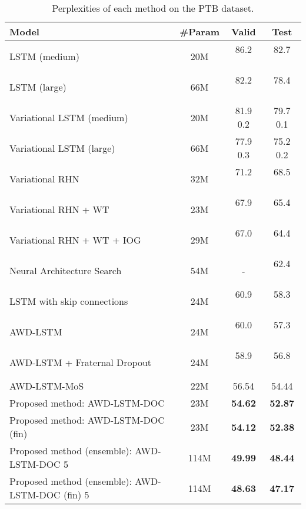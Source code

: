 \documentclass[11pt,a4paper]{article}
\begin{document}
\begin{table*}[!t]
  \centering
  \small
  \begin{tabular}{| l  | c | c c |} \hline
  Model & \#Param & Valid & Test \\ \hline
  LSTM (medium) \cite{DBLP:journals/corr/ZarembaSV14} & 20M & 86.2  \ \  & 82.7  \ \  \\
  LSTM (large) \cite{DBLP:journals/corr/ZarembaSV14} & 66M & 82.2  \ \  & 78.4  \ \  \\
  Variational LSTM (medium) \cite{Gal2016Theoretically} & 20M & 81.9  0.2 & 79.7  0.1 \\
  Variational LSTM (large) \cite{Gal2016Theoretically} & 66M & 77.9  0.3 & 75.2  0.2 \\
  Variational RHN \cite{zilly2016recurrent} & 32M & 71.2  \ \  & 68.5  \ \  \\
  Variational RHN + WT \cite{zilly2016recurrent} & 23M & 67.9  \ \  & 65.4  \ \ \\
  Variational RHN + WT + IOG \cite{takase-suzuki-nagata:2017:I17-2} & 29M & 67.0  \ \  & 64.4 \ \  \\
  Neural Architecture Search \cite{45826} & 54M & - & 62.4 \ \  \\
  LSTM with skip connections \cite{DBLP:journals/corr/MelisDB17} & 24M & 60.9  \ \  & 58.3 \ \  \\
  AWD-LSTM \cite{merityRegOpt} & 24M & 60.0  \ \  & 57.3 \ \  \\
  AWD-LSTM + Fraternal Dropout \cite{fraternal} & 24M & 58.9  \ \  & 56.8 \ \  \\
  AWD-LSTM-MoS \cite{DBLP:journals/corr/abs-1711-03953} & 22M & 56.54 & 54.44 \\ \hline
  Proposed method: AWD-LSTM-DOC & 23M & {\bf 54.62} & {\bf 52.87} \\
  Proposed method: AWD-LSTM-DOC (fin) & 23M & {\bf 54.12} & {\bf 52.38} \\
  Proposed method (ensemble): AWD-LSTM-DOC  5 & 114M & {\bf 49.99} & {\bf 48.44} \\
  Proposed method (ensemble): AWD-LSTM-DOC (fin)  5 & 114M & {\bf 48.63} & {\bf 47.17} \\ \hline
  \end{tabular}
  \caption{Perplexities of each method on the PTB dataset.\label{tb:perplexity}}
\end{table*}
\end{document}

